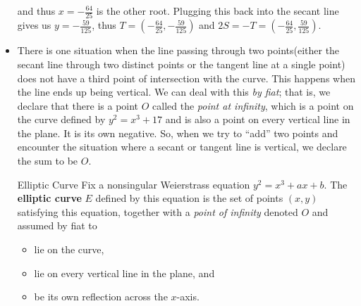 \documentclass[letterpaper]{article}
\begin{document}
\begin{itemize}
\begin{mdframed}
\begin{mdframed}

            and thus $x = -\frac{64}{25}$ is the other root. Plugging this back into the secant line gives us $y = -\frac{59}{125}$, thus $T = \left(-\frac{64}{25}, -\frac{59}{125}\right)$ and $2S = -T = \left(-\frac{64}{25}, \frac{59}{125}\right)$.
        \end{mdframed}
    \end{mdframed}

    \item There is one situation when the line passing through two points(either the secant line through two distinct points or the tangent line at a single point) does not have a third point of intersection with the curve. This happens when the line ends up being vertical. We can deal with this \emph{by fiat}; that is, we declare that there is a point $O$ called the \emph{point at infinity}, which is a point on the curve defined by $y^2 = x^3 + 17$ and is also a point on every vertical line in the plane. It is its own negative. So, when we try to ``add'' two points and encounter the situation where a secant or tangent line is vertical, we declare the sum to be $O$.
    
    \begin{definition}{Elliptic Curve}{}
        Fix a nonsingular Weierstrass equation $y^2 = x^3 + ax + b$. The \textbf{elliptic curve} $E$ defined by this equation is the set of points $(x, y)$ satisfying this equation, together with a \emph{point of infinity} denoted $O$ and assumed by fiat to 
        \begin{itemize}
            \item lie on the curve, 
            \item lie on every vertical line in the plane, and 
            \item be its own reflection across the $x$-axis. 
        \end{itemize}
    \end{definition}


\end{itemize}
\end{document}
